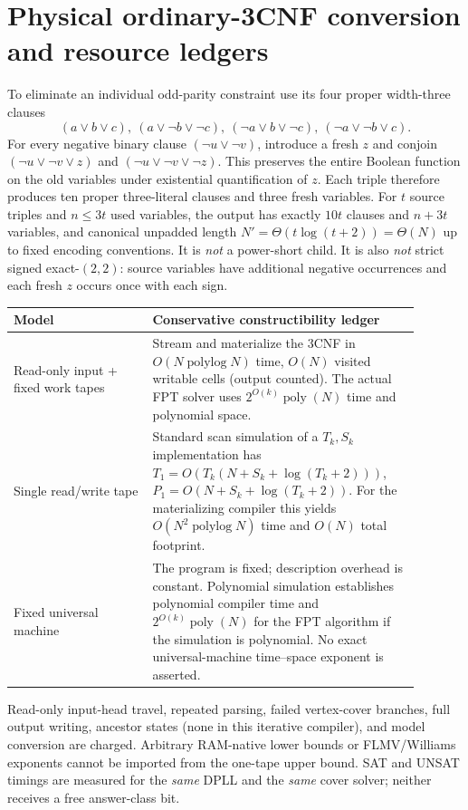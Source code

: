 \documentclass[11pt]{article}
\begin{document}
\section{Physical ordinary-3CNF conversion and resource ledgers}
To eliminate an individual odd-parity constraint use its four proper width-three clauses
\[
(a\vee b\vee c),\ (a\vee\neg b\vee\neg c),\
(\neg a\vee b\vee\neg c),\ (\neg a\vee\neg b\vee c).
\]
For every negative binary clause $(\neg u\vee\neg v)$, introduce a fresh $z$ and conjoin $(\neg u\vee\neg v\vee z)$ and $(\neg u\vee\neg v\vee\neg z)$. This preserves the entire Boolean function on the old variables under existential quantification of $z$. Each triple therefore produces ten proper three-literal clauses and three fresh variables. For $t$ source triples and $n\le3t$ used variables, the output has exactly $10t$ clauses and $n+3t$ variables, and canonical unpadded length $N'=\Theta(t\log(t+2))=\Theta(N)$ up to fixed encoding conventions. It is \emph{not} a power-short child. It is also \emph{not} strict signed exact-$(2,2)$: source variables have additional negative occurrences and each fresh $z$ occurs once with each sign.

\begin{center}
\begin{tabular}{p{0.31\linewidth}p{0.58\linewidth}}
\toprule
Model & Conservative constructibility ledger \\\midrule
Read-only input + fixed work tapes & Stream and materialize the 3CNF in $O(N\operatorname{polylog}N)$ time, $O(N)$ visited writable cells (output counted). The actual FPT solver uses $2^{O(k)}\operatorname{poly}(N)$ time and polynomial space.\\
Single read/write tape & Standard scan simulation of a $T_k,S_k$ implementation has $T_1=O(T_k(N+S_k+\log(T_k+2)))$, $P_1=O(N+S_k+\log(T_k+2))$. For the materializing compiler this yields $O(N^2\operatorname{polylog}N)$ time and $O(N)$ total footprint.\\
Fixed universal machine & The program is fixed; description overhead is constant. Polynomial simulation establishes polynomial compiler time and $2^{O(k)}\operatorname{poly}(N)$ for the FPT algorithm if the simulation is polynomial. No exact universal-machine time--space exponent is asserted.\\
\bottomrule
\end{tabular}
\end{center}
Read-only input-head travel, repeated parsing, failed vertex-cover branches, full output writing, ancestor states (none in this iterative compiler), and model conversion are charged. Arbitrary RAM-native lower bounds or FLMV/Williams exponents cannot be imported from the one-tape upper bound. SAT and UNSAT timings are measured for the \emph{same} DPLL and the \emph{same} cover solver; neither receives a free answer-class bit.
\end{document}
